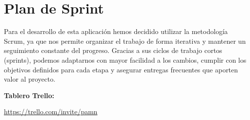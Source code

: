 \section{Plan de Sprint}
Para el desarrollo de esta aplicación hemos decidido utilizar la metodología Scrum,
 ya que nos permite organizar el trabajo de forma iterativa y mantener un seguimiento constante del progreso.
  Gracias a sus ciclos de trabajo cortos (sprints), podemos adaptarnos con mayor facilidad a los cambios, 
  cumplir con los objetivos definidos para cada etapa y asegurar entregas frecuentes que aporten valor al proyecto.

\textbf{Tablero Trello:} 

\href{https://trello.com/invite/b/6904d6168d5900e0106b2b0b/ATTI5c4a31dbf6e74e6c6ce6236d1cb9da9940AAA070/pamn}{https://trello.com/invite/pamn}



